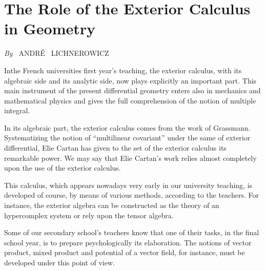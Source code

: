 
\chapter{The Role of the Exterior Calculus in Geometry}

\begin{center}
{\em By~} ANDR\'E \ LICHNEROWICZ
\end{center}


In\pageoriginale the French universities first year's teaching, the
exterior calculus, with its algebraic side and its analytic side, now
plays explicitly an important part. This main instrument of the
present differential geometry enters also in mechanics and
mathematical physics and gives the full comprehension of the notion of
multiple integral.

In its algebraic part, the exterior calculus comes from the work of
Grassmann. Systematizing the notion of ``multilinear covariant'' under
the same of exterior differential, Elie Cartan has given to the set of
the exterior calculus its remarkable power. We may say that Elie
Cartan's work relies almost completely upon the use of the exterior
calculus. 

This calculus, which appears nowadays very early in our university
teaching, is developed of course, by means of various methods,
according to the teachers. For instance, the exterior algebra can be
constructed as the theory of an hypercomplex system or rely upon the
tensor algebra.

Some of our secondary school's teachers know that one of their tasks,
in the final school year, is to prepare psychologically its
elaboration. The notions of vector product, mixed product and
potential of a vector field, for instance, must be developed under
this point of view. 

